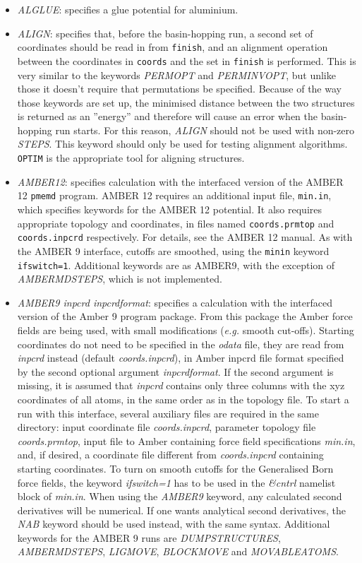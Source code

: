 \documentclass[12pt,a4paper,dvips]{article}
\begin{document}
\begin{itemize}
\item {\it ALGLUE\/}: specifies a glue potential for aluminium.

\item {\it ALIGN\/}: specifies that, before the basin-hopping run, a second set of coordinates should be read in from {\tt finish}, and an alignment operation between the coordinates in {\tt coords} and the set in {\tt finish} is performed. This is very similar to the keywords {\it PERMOPT} and {\it PERMINVOPT}, but unlike those it doesn't require that permutations be specified. Because of the way those keywords are set up, the minimised distance between the two structures is returned as an ''energy'' and therefore will cause an error when the basin-hopping run starts. For this reason, {\it ALIGN} should not be used with non-zero {\it STEPS}. This keyword should only be used for testing alignment algorithms. {\tt OPTIM} is the appropriate tool for aligning structures.

\item {\it AMBER12\/}: specifies calculation with the interfaced version of the AMBER 12 
{\tt pmemd} program. AMBER 12 requires an additional input file, {\tt min.in}, which specifies
keywords for the AMBER 12 potential. It also requires appropriate topology and coordinates, in files
named {\tt coords.prmtop} and {\tt coords.inpcrd} respectively. For details, see the AMBER 12 manual.
As with the AMBER 9 interface, cutoffs are smoothed, using the {\tt min\.in} keyword {\tt ifswitch=1}.
Additional keywords are as AMBER9, with the exception of {\it AMBERMDSTEPS}, which is not implemented.

\item {\it AMBER9 inpcrd inpcrdformat\/}: specifies a calculation with the interfaced
version of the Amber 9 program package. From this package the Amber force fields
are being used, with small modifications ({\it e.g.} smooth cut-offs).
Starting coordinates do not need to be specified in the {\it odata} file, they
are read from {\it inpcrd} instead (default {\it coords.inpcrd}), in Amber inpcrd
file format specified by the second optional argument {\it inpcrdformat}.
If the second argument is missing, it is assumed that {\it inpcrd} contains
only three columns with the xyz coordinates of all atoms, in the same order
as in the topology file. To start a run with this interface,
several auxiliary files are required in the same directory: input coordinate file
{\it coords.inpcrd}, parameter topology file {\it coords.prmtop},
input file to Amber containing force field specifications {\it min.in}, and, if
desired, a coordinate file different from {\it coords.inpcrd} containing
starting coordinates.
To turn on smooth cutoffs for the Generalised Born force fields, the keyword
{\it ifswitch=1} has to be used in the {\it \&cntrl} namelist block of {\it min.in}.
When using the {\it AMBER9} keyword, any calculated second derivatives will be
numerical. If one wants analytical second derivatives, the {\it NAB} keyword
should be used instead, with the same syntax. 
Additional keywords for the AMBER 9 runs are {\it DUMPSTRUCTURES}, {\it AMBERMDSTEPS},
{\it LIGMOVE}, {\it BLOCKMOVE} and {\it MOVABLEATOMS}.


\end{itemize}
\end{document}
